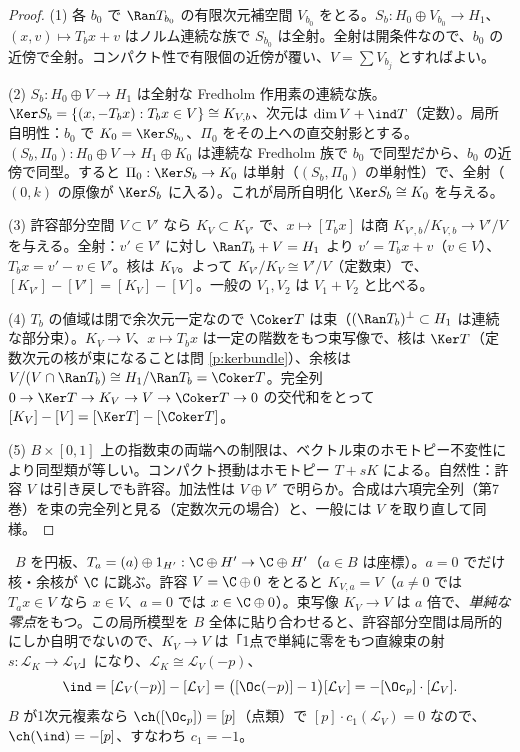 \begin{proof}
(1) 各 $b_0$ で $\Ran T_{b_0}$ の有限次元補空間 $V_{b_0}$ をとる。$S_b:H_0\oplus V_{b_0}\to H_1$、$(x,v)\mapsto T_bx+v$ はノルム連続な族で $S_{b_0}$ は全射。全射は開条件なので、$b_0$ の近傍で全射。コンパクト性で有限個の近傍が覆い、$V=\sum V_{b_j}$ とすればよい。

(2) $S_b:H_0\oplus V\to H_1$ は全射な Fredholm 作用素の連続な族。$\Ker S_b=\{(x,-T_bx):T_bx\in V\}\cong K_{V,b}$、次元は $\dim V+\ind T$（定数）。局所自明性：$b_0$ で $K_0=\Ker S_{b_0}$、$\Pi_0$ をその上への直交射影とする。$(S_b,\Pi_0):H_0\oplus V\to H_1\oplus K_0$ は連続な Fredholm 族で $b_0$ で同型だから、$b_0$ の近傍で同型。すると $\Pi_0:\Ker S_b\to K_0$ は単射（$(S_b,\Pi_0)$ の単射性）で、全射（$(0,k)$ の原像が $\Ker S_b$ に入る）。これが局所自明化 $\Ker S_b\cong K_0$ を与える。

(3) 許容部分空間 $V\subset V'$ なら $K_V\subset K_{V'}$ で、$x\mapsto[T_bx]$ は商 $K_{V',b}/K_{V,b}\to V'/V$ を与える。全射：$v'\in V'$ に対し $\Ran T_b+V=H_1$ より $v'=T_bx+v$（$v\in V$）、$T_bx=v'-v\in V'$。核は $K_V$。よって $K_{V'}/K_V\cong V'/V$（定数束）で、$[K_{V'}]-[V']=[K_V]-[V]$。一般の $V_1,V_2$ は $V_1+V_2$ と比べる。

(4) $T_b$ の値域は閉で余次元一定なので $\Coker T$ は束（$(\Ran T_b)^\perp\subset H_1$ は連続な部分束）。$K_V\to V$、$x\mapsto T_bx$ は一定の階数をもつ束写像で、核は $\Ker T$（定数次元の核が束になることは問 \ref{p:kerbundle}）、余核は $V/(V\cap\Ran T_b)\cong H_1/\Ran T_b=\Coker T$。完全列 $0\to\Ker T\to K_V\to V\to\Coker T\to0$ の交代和をとって $[K_V]-[V]=[\Ker T]-[\Coker T]$。

(5) $B\times[0,1]$ 上の指数束の両端への制限は、ベクトル束のホモトピー不変性により同型類が等しい。コンパクト摂動はホモトピー $T+sK$ による。自然性：許容 $V$ は引き戻しでも許容。加法性は $V\oplus V'$ で明らか。合成は六項完全列（第7巻）を束の完全列と見る（定数次元の場合）と、一般には $V$ を取り直して同様。
\end{proof}
\begin{ex}[跳びの局所模型]\label{ex:localmodel}\tP\
$B$ を円板、$T_a=(a)\oplus1_{H'}:\C\oplus H'\to\C\oplus H'$（$a\in B$ は座標）。$a=0$ でだけ核・余核が $\C$ に跳ぶ。許容 $V=\C\oplus0$ をとると $K_{V,a}=V$（$a\ne0$ では $T_ax\in V$ なら $x\in V$、$a=0$ では $x\in\C\oplus0$）。束写像 $K_V\to V$ は $a$ 倍で、\emph{単純な零点}をもつ。この局所模型を $B$ 全体に貼り合わせると、許容部分空間は局所的にしか自明でないので、$K_V\to V$ は「1点で単純に零をもつ直線束の射 $s:\mathcal L_K\to\mathcal L_V$」になり、$\mathcal L_K\cong\mathcal L_V(-p)$、
\[
\ind=[\mathcal L_V(-p)]-[\mathcal L_V]=\bigl([\Oc(-p)]-1\bigr)[\mathcal L_V]=-[\Oc_p]\cdot[\mathcal L_V].
\]
$B$ が1次元複素なら $\ch([\Oc_p])=[p]$（点類）で $[p]\cdot c_1(\mathcal L_V)=0$ なので、$\ch(\ind)=-[p]$、すなわち $c_1=-1$。
\end{ex}
